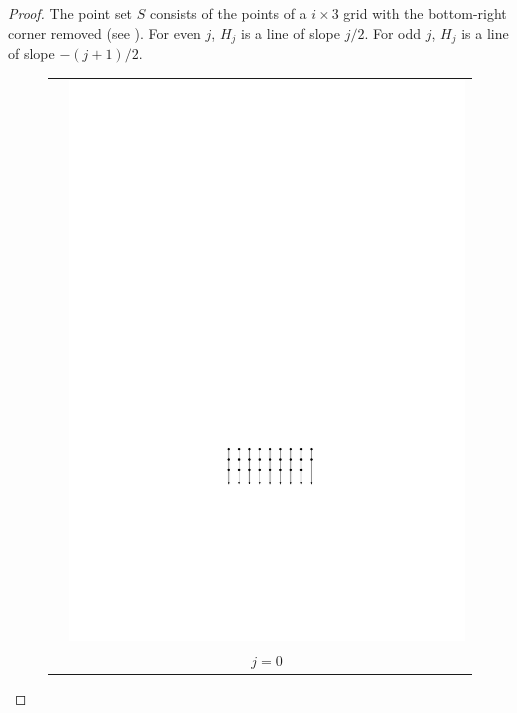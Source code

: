 \documentclass{cccg10}
\begin{document}
\begin{proof}
The point set $S$ consists of the points of a $i\times 3$ grid with the bottom-right corner removed (see ).  For even $j$, $H_j$ is a line of slope $j/2$.  For odd $j$, $H_j$ is a line of slope $-(j+1)/2$.
\begin{figure}
  \begin{center} 
    \begin{tabular}{cc}
      & \includegraphics{j0} \\ 
      & $j = 0$  \\

\end{tabular}
\end{center}
\end{figure}
\end{proof}
\end{document}
